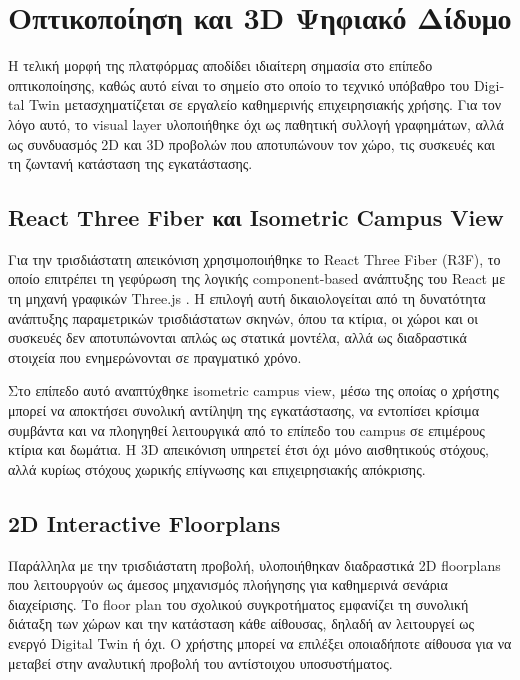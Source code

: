 \section{\texorpdfstring{Οπτικοποίηση και \textlatin{3D} Ψηφιακό Δίδυμο}{Οπτικοποίηση και 3D Ψηφιακό Δίδυμο}}
Η τελική μορφή της πλατφόρμας αποδίδει ιδιαίτερη σημασία στο επίπεδο οπτικοποίησης, καθώς αυτό είναι το σημείο στο οποίο το τεχνικό υπόβαθρο του \textlatin{Digital Twin} μετασχηματίζεται σε εργαλείο καθημερινής επιχειρησιακής χρήσης. Για τον λόγο αυτό, το \textlatin{visual layer} υλοποιήθηκε όχι ως παθητική συλλογή γραφημάτων, αλλά ως συνδυασμός \textlatin{2D} και \textlatin{3D} προβολών που αποτυπώνουν τον χώρο, τις συσκευές και τη ζωντανή κατάσταση της εγκατάστασης.

\subsection{\texorpdfstring{\textlatin{React Three Fiber} και \textlatin{Isometric Campus View}}{React Three Fiber και Isometric Campus View}}
Για την τρισδιάστατη απεικόνιση χρησιμοποιήθηκε το \textlatin{React Three Fiber (R3F)}, το οποίο επιτρέπει τη γεφύρωση της λογικής \textlatin{component-based} ανάπτυξης του \textlatin{React} με τη μηχανή γραφικών \textlatin{Three.js} \cite{PMNDRS2024}. Η επιλογή αυτή δικαιολογείται από τη δυνατότητα ανάπτυξης παραμετρικών τρισδιάστατων σκηνών, όπου τα κτίρια, οι χώροι και οι συσκευές δεν αποτυπώνονται απλώς ως στατικά μοντέλα, αλλά ως διαδραστικά στοιχεία που ενημερώνονται σε πραγματικό χρόνο.

Στο επίπεδο αυτό αναπτύχθηκε \textlatin{isometric campus view}, μέσω της οποίας ο χρήστης μπορεί να αποκτήσει συνολική αντίληψη της εγκατάστασης, να εντοπίσει κρίσιμα συμβάντα και να πλοηγηθεί λειτουργικά από το επίπεδο του \textlatin{campus} σε επιμέρους κτίρια και δωμάτια. Η \textlatin{3D} απεικόνιση υπηρετεί έτσι όχι μόνο αισθητικούς στόχους, αλλά κυρίως στόχους χωρικής επίγνωσης και επιχειρησιακής απόκρισης.

\subsection{\texorpdfstring{\textlatin{2D Interactive Floorplans}}{2D Interactive Floorplans}}
Παράλληλα με την τρισδιάστατη προβολή, υλοποιήθηκαν διαδραστικά \textlatin{2D floorplans} που λειτουργούν ως άμεσος μηχανισμός πλοήγησης για καθημερινά σενάρια διαχείρισης. Το \textlatin{floor plan} του σχολικού συγκροτήματος εμφανίζει τη συνολική διάταξη των χώρων και την κατάσταση κάθε αίθουσας, δηλαδή αν λειτουργεί ως ενεργό \textlatin{Digital Twin} ή όχι. Ο χρήστης μπορεί να επιλέξει οποιαδήποτε αίθουσα για να μεταβεί στην αναλυτική προβολή του αντίστοιχου υποσυστήματος.

